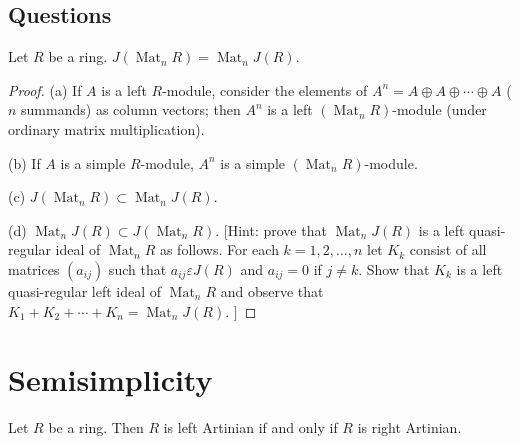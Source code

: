 \subsection{Questions}
\begin{question}
    Let $R$ be a ring. $J\left(\operatorname{Mat}_n R\right)=\operatorname{Mat}_n J(R)$.
    \begin{proof}
        (a) If $A$ is a left $R$-module, consider the elements of $A^n=A \oplus A \oplus \cdots \oplus A$ ( $n$ summands) as column vectors; then $A^n$ is a left $\left(\operatorname{Mat}_n R\right)$-module (under ordinary matrix multiplication).

        (b) If $A$ is a simple $R$-module, $A^n$ is a simple $\left(\operatorname{Mat}_n R\right)$-module.

        (c) $J\left(\operatorname{Mat}_n R\right) \subset \operatorname{Mat}_n J(R)$.

        (d) $\operatorname{Mat}_n J(R) \subset J\left(\operatorname{Mat}_n R\right)$. [Hint: prove that $\operatorname{Mat}_n J(R)$ is a left quasi-regular ideal of $\operatorname{Mat}_n R$ as follows. For each $k=1,2, \ldots, n$ let $K_k$ consist of all matrices $\left(a_{i j}\right)$ such that $a_{i j} \varepsilon J(R)$ and $a_{i j}=0$ if $j \neq k$. Show that $K_k$ is a left quasi-regular left ideal of $\operatorname{Mat}_n R$ and observe that $K_1+K_2+\cdots+K_n=\operatorname{Mat}_n J(R)$. $]$
    \end{proof}
\end{question}


\section{Semisimplicity} %
\begin{theorem}
    Let $R$ be a ring. Then $R$ is left Artinian if and only if $R$ is right Artinian.
\end{theorem}
